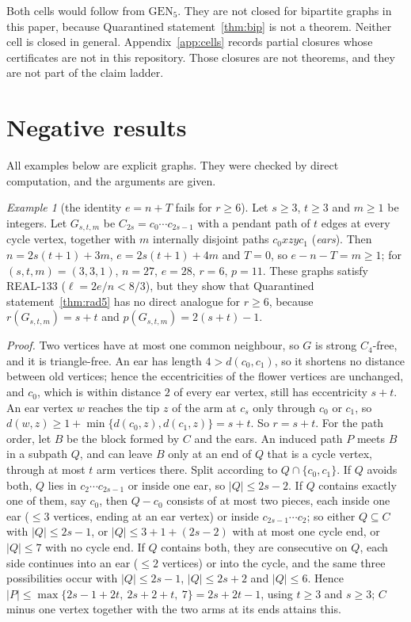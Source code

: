 \documentclass[11pt]{amsart}
\theoremstyle{definition}
\theoremstyle{remark}
\newtheorem{example}[theorem]{Example}
\newcommand{\lr}{\ell}
\newcommand{\pp}{p}
\newcommand{\GEN}{\mathrm{GEN}}
\begin{document}
Both cells would follow from $\GEN_5$. They are not closed for bipartite graphs in this paper, because Quarantined statement~\ref{thm:bip} is not a theorem. Neither cell is closed in general. Appendix~\ref{app:cells} records partial closures whose certificates are not in this repository. Those closures are not theorems, and they are not part of the claim ladder.

\section{Negative results}\label{sec:neg}

All examples below are explicit graphs. They were checked by direct computation, and the arguments are given.

\begin{example}[the identity $e=n+T$ fails for $r\ge6$]\label{ex:radstar}
Let $s\ge3$, $t\ge3$ and $m\ge1$ be integers. Let $G_{s,t,m}$ be $C_{2s}=c_0\cdots c_{2s-1}$ with a pendant path of $t$ edges at every cycle vertex, together with $m$ internally disjoint paths $c_0xzyc_1$ (\emph{ears}). Then $n=2s(t+1)+3m$, $e=2s(t+1)+4m$ and $T=0$, so $e-n-T=m\ge1$; for $(s,t,m)=(3,3,1)$, $n=27$, $e=28$, $r=6$, $\pp=11$. These graphs satisfy REAL-133 ($\lr=2e/n<8/3$), but they show that Quarantined statement~\ref{thm:rad5} has no direct analogue for $r\ge6$, because $r(G_{s,t,m})=s+t$ and $\pp(G_{s,t,m})=2(s+t)-1$.

\emph{Proof.} Two vertices have at most one common neighbour, so $G$ is strong $C_4$-free, and it is triangle-free. An ear has length $4>d(c_0,c_1)$, so it shortens no distance between old vertices; hence the eccentricities of the flower vertices are unchanged, and $c_0$, which is within distance $2$ of every ear vertex, still has eccentricity $s+t$. An ear vertex $w$ reaches the tip $z$ of the arm at $c_s$ only through $c_0$ or $c_1$, so $d(w,z)\ge1+\min\{d(c_0,z),d(c_1,z)\}=s+t$. So $r=s+t$. For the path order, let $B$ be the block formed by $C$ and the ears. An induced path $P$ meets $B$ in a subpath $Q$, and can leave $B$ only at an end of $Q$ that is a cycle vertex, through at most $t$ arm vertices there. Split according to $Q\cap\{c_0,c_1\}$. If $Q$ avoids both, $Q$ lies in $c_2\cdots c_{2s-1}$ or inside one ear, so $|Q|\le2s-2$. If $Q$ contains exactly one of them, say $c_0$, then $Q-c_0$ consists of at most two pieces, each inside one ear ($\le3$ vertices, ending at an ear vertex) or inside $c_{2s-1}\cdots c_2$; so either $Q\subseteq C$ with $|Q|\le2s-1$, or $|Q|\le3+1+(2s-2)$ with at most one cycle end, or $|Q|\le7$ with no cycle end. If $Q$ contains both, they are consecutive on $Q$, each side continues into an ear ($\le2$ vertices) or into the cycle, and the same three possibilities occur with $|Q|\le2s-1$, $|Q|\le2s+2$ and $|Q|\le6$. Hence $|P|\le\max\{2s-1+2t,\ 2s+2+t,\ 7\}=2s+2t-1$, using $t\ge3$ and $s\ge3$; $C$ minus one vertex together with the two arms at its ends attains this.
\end{example}
\end{document}
